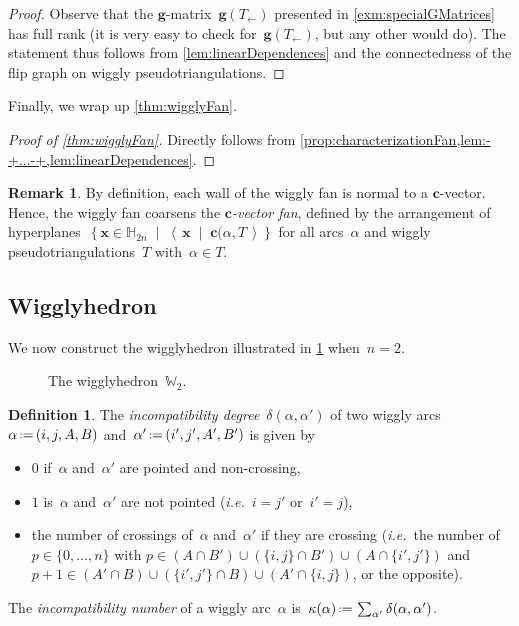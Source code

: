 \documentclass{amsart}
\theoremstyle{definition}
\newtheorem{definition}[theorem]{Definition}
\newtheorem{remark}[theorem]{Remark}
\newcommand{\HH}{\mathbb{H}} %
\renewcommand{\b}[1]{{\boldsymbol{#1}}} %
\newcommand{\set}[2]{\left\{ #1 \;\middle|\; #2 \right\}} %
\newcommand{\dotprod}[2]{\left\langle \, #1 \; \middle| \; #2 \, \right\rangle} %
\newcommand{\eqdef}{\mbox{\,\raisebox{0.2ex}{\scriptsize\ensuremath{\mathrm:}}\ensuremath{=}\,}} %
\newcommand{\ie}{\textit{i.e.}~} %
\newcommand{\darkblue}{\color{darkblue}} %
\newcommand{\defn}[1]{\textsl{\darkblue #1}} %
\newcommand{\polytope}[1]{\mathds{#1}} %
\newcommand{\wigglyhedron}{\polytope{W}} %
\begin{document}
\begin{proof}
Observe that the $\b{g}$-matrix~$\b{g}(T_\leftarrow)$ presented in \cref{exm:specialGMatrices} has full rank (it is very easy to check for~$\b{g}(T_\leftarrow)$, but any other would do).
The statement thus follows from \cref{lem:linearDependences} and the connectedness of the flip graph on wiggly pseudotriangulations.
\end{proof}

Finally, we wrap up \cref{thm:wigglyFan}.

\begin{proof}[Proof of \cref{thm:wigglyFan}]
Directly follows from \cref{prop:characterizationFan,lem:-+...-+,lem:linearDependences}.
\end{proof}

\begin{remark}
By definition, each wall of the wiggly fan is normal to a $\b{c}$-vector.
Hence, the wiggly fan coarsens the \defn{$\b{c}$-vector fan}, defined by the arrangement of hyperplanes~$\set{\b{x} \in \HH_{2n}}{\dotprod{\b{x}}{\b{c}(\alpha, T}}$ for all arcs~$\alpha$ and wiggly pseudotriangulations~$T$ with~$\alpha \in T$.
\end{remark}


\subsection{Wigglyhedron}
\label{subsec:wigglyhedron}

We now construct the wigglyhedron illustrated in \cref{fig:wigglyhedron} when~${n = 2}$.
%
\begin{figure}[t]
\centerline{}
\caption{The wigglyhedron~$\wigglyhedron_2$.}
\label{fig:wigglyhedron}
\end{figure}

\begin{definition}
\label{def:incompatibilityDegree}
The \defn{incompatibility degree}~$\delta(\alpha, \alpha')$ of two wiggly arcs~$\alpha \eqdef (i, j, A, B)$ and~$\alpha' \eqdef (i', j', A', B')$ is given by
\begin{itemize}
\item $0$ if~$\alpha$ and~$\alpha'$ are pointed and non-crossing,
\item $1$ is~$\alpha$ and~$\alpha'$ are not pointed (\ie $i = j'$ or~$i' = j$),
\item the number of crossings of~$\alpha$ and~$\alpha'$ if they are crossing (\ie the number of~$p \in \{0, \dots, n\}$ with $p \in (A \cap B') \cup (\{i,j\} \cap B') \cup (A \cap \{i',j'\})$ and~$p+1 \in (A' \cap B) \cup (\{i',j'\} \cap B) \cup (A' \cap \{i,j\})$, or the opposite).
\end{itemize}
The \defn{incompatibility number} of a wiggly arc~$\alpha$ is~$\kappa(\alpha) \eqdef \sum_{\alpha'} \delta(\alpha, \alpha')$.
\end{definition}
\end{document}
